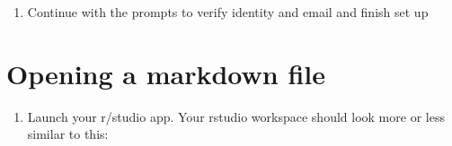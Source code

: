 \documentclass[
]{book}
\providecommand{\tightlist}{%
  \setlength{\itemsep}{0pt}\setlength{\parskip}{0pt}}
\begin{document}
\begin{enumerate}
\def\labelenumi{\arabic{enumi}.}
\setcounter{enumi}{3}
\tightlist
\item
  Continue with the prompts to verify identity and email and finish set up
\end{enumerate}

\hypertarget{opening-a-markdown-file}{%
\section{Opening a markdown file}\label{opening-a-markdown-file}}

\begin{enumerate}
\def\labelenumi{\arabic{enumi}.}
\tightlist
\item
  Launch your r/studio app.
  Your rstudio workspace should look more or less similar to this:
\end{enumerate}
\end{document}
